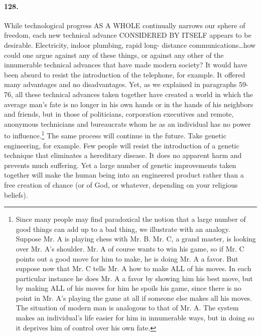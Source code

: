 \documentclass[12pt]{book}
\begin{document}
\paragraph{128.} While technological progress AS A WHOLE continually narrows our sphere of freedom, each new technical advance CONSIDERED BY ITSELF appears to be desirable. Electricity, indoor plumbing, rapid long- distance communications\dots{}how could one argue against any of these things, or against any other of the innumerable technical advances that have made modern society? It would have been absurd to resist the introduction of the telephone, for example. It offered many advantages and no disadvantages. Yet, as we explained in paragraphs 59-76, all these technical advances taken together have created a world in which the average man's fate is no longer in his own hands or in the hands of his neighbors and friends, but in those of politicians, corporation executives and remote, anonymous technicians and bureaucrats whom he as an individual has no power to influence.\footnote{Since many people may find paradoxical the notion that a large number of good things can add up to a bad thing, we illustrate with an analogy. Suppose Mr. A is playing chess with Mr. B. Mr. C, a grand master, is looking over Mr. A's shoulder. Mr. A of course wants to win his game, so if Mr. C points out a good move for him to make, he is doing Mr. A a favor. But suppose now that Mr. C tells Mr. A how to make ALL of his moves. In each particular instance he does Mr. A a favor by showing him his best move, but by making ALL of his moves for him he spoils his game, since there is no point in Mr. A's playing the game at all if someone else makes all his moves. The situation of modern man is analogous to that of Mr. A. The system makes an individual's life easier for him in innumerable ways, but in doing so it deprives him of control over his own fate.} The same process will continue in the future. Take genetic engineering, for example. Few people will resist the introduction of a genetic technique that eliminates a hereditary disease. It does no apparent harm and prevents much suffering. Yet a large number of genetic improvements taken together will make the human being into an engineered product rather than a free creation of chance (or of God, or whatever, depending on your religious beliefs).
\end{document}
